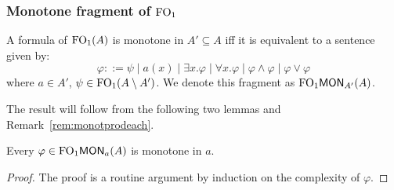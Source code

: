 \subsubsection{Monotone fragment of $\mathrm{FO}_1$}

\begin{theorem}\label{thm:ofomonot}
A formula of $\mathrm{FO}_1(A)$ is monotone in $A' \subseteq A$ iff it is equivalent to a sentence given by:
\[
\varphi ::= \psi \mid a(x) \mid \exists x.\varphi \mid \forall x.\varphi \mid \varphi \land \varphi \mid \varphi \lor \varphi
\]
where $a \in A'$,
$\psi \in \mathrm{FO}_1(A\setminus A')$. We denote this fragment as $\mathrm{FO}_1\mathsf{MON}_{A'}(A)$.
\end{theorem}
%
The result will follow from the following two lemmas and Remark~\ref{rem:monotprodeach}.

\begin{lemma}\label{lem:monofoismonot}
Every $\varphi \in \mathrm{FO}_1\mathsf{MON}_{a}(A)$ is monotone in $a$.
\end{lemma}
\begin{proof}
	The proof is a routine argument by induction on the complexity of $\varphi$.
\end{proof}




